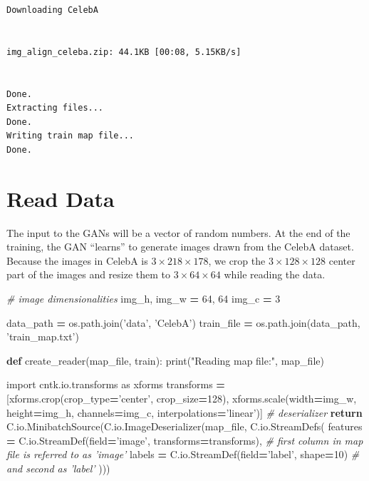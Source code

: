 \documentclass[]{book}
\newenvironment{Shaded}{\begin{snugshade}}{\end{snugshade}}
\newcommand{\KeywordTok}[1]{\textcolor[rgb]{0.13,0.29,0.53}{\textbf{#1}}}
\newcommand{\DecValTok}[1]{\textcolor[rgb]{0.00,0.00,0.81}{#1}}
\newcommand{\StringTok}[1]{\textcolor[rgb]{0.31,0.60,0.02}{#1}}
\newcommand{\ImportTok}[1]{#1}
\newcommand{\CommentTok}[1]{\textcolor[rgb]{0.56,0.35,0.01}{\textit{#1}}}
\newcommand{\ControlFlowTok}[1]{\textcolor[rgb]{0.13,0.29,0.53}{\textbf{#1}}}
\newcommand{\OperatorTok}[1]{\textcolor[rgb]{0.81,0.36,0.00}{\textbf{#1}}}
\newcommand{\BuiltInTok}[1]{#1}
\newcommand{\NormalTok}[1]{#1}
\theoremstyle{definition}
\theoremstyle{definition}
\theoremstyle{definition}
\theoremstyle{remark}
\begin{document}
\begin{verbatim}
Downloading CelebA


img_align_celeba.zip: 44.1KB [00:08, 5.15KB/s]


Done.
Extracting files...
Done.
Writing train map file...
Done.
\end{verbatim}

\section{Read Data}\label{read-data}

The input to the GANs will be a vector of random numbers. At the end of
the training, the GAN ``learns'' to generate images drawn from the
CelebA dataset. Because the images in CelebA is \(3\times218\times178\),
we crop the \(3\times128\times128\) center part of the images and resize
them to \(3\times64\times64\) while reading the data.

\begin{Shaded}
\begin{Highlighting}[]
\CommentTok{# image dimensionalities}
\NormalTok{img_h, img_w }\OperatorTok{=} \DecValTok{64}\NormalTok{, }\DecValTok{64}
\NormalTok{img_c }\OperatorTok{=} \DecValTok{3}
\end{Highlighting}
\end{Shaded}

\begin{Shaded}
\begin{Highlighting}[]
\NormalTok{data_path }\OperatorTok{=}\NormalTok{ os.path.join(}\StringTok{'data'}\NormalTok{, }\StringTok{'CelebA'}\NormalTok{)}
\NormalTok{train_file }\OperatorTok{=}\NormalTok{ os.path.join(data_path, }\StringTok{'train_map.txt'}\NormalTok{)}

\KeywordTok{def}\NormalTok{ create_reader(map_file, train):}
    \BuiltInTok{print}\NormalTok{(}\StringTok{"Reading map file:"}\NormalTok{, map_file)}
    
    \ImportTok{import}\NormalTok{ cntk.io.transforms }\ImportTok{as}\NormalTok{ xforms}
\NormalTok{    transforms }\OperatorTok{=}\NormalTok{ [xforms.crop(crop_type}\OperatorTok{=}\StringTok{'center'}\NormalTok{, crop_size}\OperatorTok{=}\DecValTok{128}\NormalTok{),}
\NormalTok{                  xforms.scale(width}\OperatorTok{=}\NormalTok{img_w, height}\OperatorTok{=}\NormalTok{img_h, channels}\OperatorTok{=}\NormalTok{img_c, interpolations}\OperatorTok{=}\StringTok{'linear'}\NormalTok{)]}
    \CommentTok{# deserializer}
    \ControlFlowTok{return}\NormalTok{ C.io.MinibatchSource(C.io.ImageDeserializer(map_file, C.io.StreamDefs(}
\NormalTok{        features }\OperatorTok{=}\NormalTok{ C.io.StreamDef(field}\OperatorTok{=}\StringTok{'image'}\NormalTok{, transforms}\OperatorTok{=}\NormalTok{transforms), }\CommentTok{# first column in map file is referred to as 'image'}
\NormalTok{        labels   }\OperatorTok{=}\NormalTok{ C.io.StreamDef(field}\OperatorTok{=}\StringTok{'label'}\NormalTok{, shape}\OperatorTok{=}\DecValTok{10}\NormalTok{)      }\CommentTok{# and second as 'label'}
\NormalTok{    )))}
\end{Highlighting}
\end{Shaded}
\end{document}
